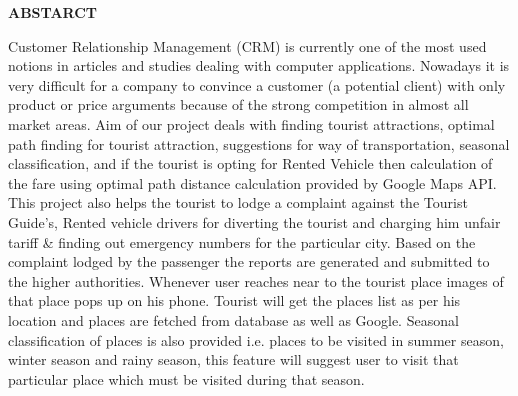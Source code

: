 \documentclass[12pt,a4paper]{article}
\begin{document}
\newpage
{}
\pagestyle{plain}           %
\begin{center}
\bf ABSTARCT
\end{center}
\hspace{0.7cm} Customer Relationship Management (CRM) is currently one of the most used notions in articles and studies dealing with computer applications. Nowadays it is very difficult for a company to convince a customer (a potential client) with only product or price arguments because of the strong competition in almost all market areas. Aim of our project deals with finding tourist attractions, optimal path finding for tourist attraction, suggestions for way of transportation, seasonal classification, and if the tourist is opting for Rented Vehicle then calculation of the fare using optimal path distance calculation provided by Google Maps API. This project also helps the tourist to lodge a complaint against the Tourist Guide’s, Rented vehicle drivers for diverting the tourist and charging him unfair tariff & finding out emergency numbers for the particular city. Based on the complaint lodged by the passenger the reports are generated and submitted to the higher authorities. Whenever user reaches near to the tourist place images of that place pops up on his phone. Tourist will get the places list as per his location and places are fetched from database as well as Google. Seasonal classification of places is also provided i.e. places to be visited in summer season, winter season and rainy season, this feature will suggest user to visit that particular place which must be visited during that season.



\newpage
{\setlength{\baselineskip}{1.5\baselineskip}
\listoffigures
{}
}

\newpage
{\setlength{\baselineskip}{1.5\baselineskip}
\tableofcontents
}
\end{document}
